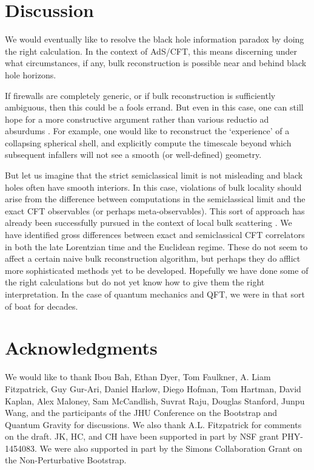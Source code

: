 \documentclass[12pt]{article}
\numberwithin{equation}{section}
\begin{document}
\section{Discussion}

We would eventually like to resolve the black hole information paradox by doing the right calculation.  In the context of AdS/CFT, this means discerning under what circumstances, if any, bulk reconstruction is possible near and behind black hole horizons.  

If firewalls \cite{Almheiri:2012rt} are completely generic, or if bulk reconstruction is sufficiently ambiguous, then this could be a fools errand.    But even in this case, one can still hope for a more constructive argument rather than various reductio ad absurdums \cite{Almheiri:2013hfa}.  For example, one would like to reconstruct the `experience' of a collapsing spherical shell, and explicitly compute the timescale beyond which subsequent infallers will not see a smooth (or well-defined) geometry.

But let us imagine that the strict semiclassical limit is not misleading and black holes often have smooth interiors.  In this case, violations of bulk locality should arise from the difference between computations in the semiclassical limit and the exact CFT observables (or perhaps meta-observables).  This sort of approach has already been successfully pursued in the context of local bulk scattering \cite{Maldacena:2015iua}.  We have identified gross differences between exact and semiclassical CFT correlators in both the late Lorentzian time and the Euclidean regime.    These do not seem to affect a certain naive bulk reconstruction algorithm, but perhaps they do afflict more sophisticated methods yet to be developed.   Hopefully we have done some of the right calculations but do not yet know how to give them the right interpretation.  In the case of quantum mechanics and QFT, we were in that sort of boat for decades.


\section*{Acknowledgments}
 
We would like to thank Ibou Bah, Ethan Dyer, Tom Faulkner, A. Liam Fitzpatrick, Guy Gur-Ari, Daniel Harlow, Diego Hofman, Tom Hartman, David Kaplan, Alex Maloney, Sam McCandlish, Suvrat Raju, Douglas Stanford, Junpu Wang, and the participants of the JHU Conference on the Bootstrap and Quantum Gravity for discussions. We also thank A.L. Fitzpatrick for comments on the draft.  JK, HC, and CH  have been supported in part by NSF grant PHY-1454083.  We were also supported in part by the Simons Collaboration Grant on the Non-Perturbative Bootstrap.  
\end{document}

